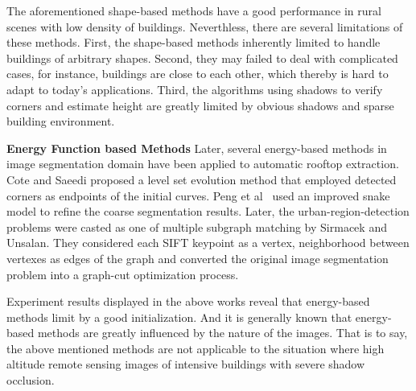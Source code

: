 The aforementioned shape-based methods have a good performance in rural scenes with low density of buildings.
Neverthless, there are several limitations of these methods.
First, the shape-based methods inherently limited to handle buildings of arbitrary shapes.
Second, they may failed to deal with complicated cases, for instance, buildings are close to each other, which thereby is hard to adapt to today's applications.
Third, the algorithms using shadows to verify corners and estimate height are greatly limited by obvious shadows and sparse building environment.


\textbf{Energy Function based Methods} Later, several energy-based methods in image segmentation domain have been applied to automatic rooftop extraction.
Cote and Saeedi\cite{IEEEexample:cote2013automatic} proposed a level set evolution method that employed detected corners as endpoints of the initial curves.
Peng et al~\cite{IEEEexample:peng2005improved} used an improved snake model to refine the coarse segmentation results.
Later, the urban-region-detection problems were casted as one of multiple subgraph matching by Sirmacek and Unsalan\cite{IEEEexample:sirmacek2009urban}.
They considered each SIFT keypoint as a vertex, neighborhood between vertexes as edges of the graph and converted the original image segmentation problem into a graph-cut optimization process.

Experiment results displayed in the above works reveal that energy-based methods limit by a good initialization.
And it is generally known that energy-based methods are greatly influenced by the nature of the images.
That is to say, the above mentioned methods are not applicable to the situation where high altitude remote sensing images of intensive buildings with severe shadow occlusion.


